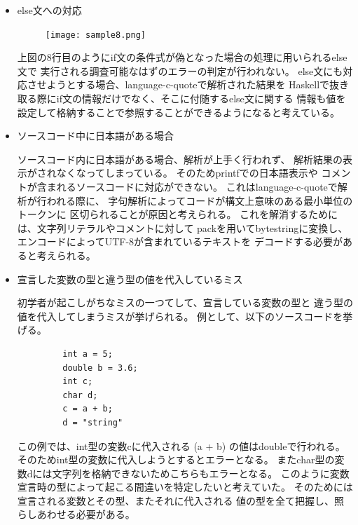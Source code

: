 \documentclass{csspaper}
\begin{document}
\begin{itemize}
         \item else文への対応
         
         \begin{figure}[h]
            \centering
            \texttt{[image: sample8.png]}
         \end{figure}

         上図の8行目のようにif文の条件式が偽となった場合の処理に用いられるelse文で
         実行される調査可能なはずのエラーの判定が行われない。
         else文にも対応させようとする場合、language-c-quoteで解析された結果を
         Haskellで抜き取る際にif文の情報だけでなく、そこに付随するelse文に関する
         情報も値を設定して格納することで参照することができるようになると考えている。

         \item ソースコード中に日本語がある場合
         
         ソースコード内に日本語がある場合、解析が上手く行われず、
         解析結果の表示がされなくなってしまっている。
         そのためprintfでの日本語表示や
         コメントが含まれるソースコードに対応ができない。
         これはlanguage-c-quoteで解析が行われる際に、
         字句解析によってコードが構文上意味のある最小単位のトークンに
         区切られることが原因と考えられる。
         これを解消するためには、文字列リテラルやコメントに対して
         packを用いてbytestringに変換し、
         エンコードによってUTF-8が含まれているテキストを
         デコードする必要があると考えられる。

         \item 宣言した変数の型と違う型の値を代入しているミス
         
         初学者が起こしがちなミスの一つてして、宣言している変数の型と
         違う型の値を代入してしまうミスが挙げられる。
         例として、以下のソースコードを挙げる。

         \begin{lstlisting}
         int a = 5;
         double b = 3.6;
         int c;
         char d;
         c = a + b;
         d = "string"
         \end{lstlisting}

         この例では、int型の変数cに代入される (a + b) の値はdoubleで行われる。
         そのためint型の変数に代入しようとするとエラーとなる。
         またchar型の変数dには文字列を格納できないためこちらもエラーとなる。
         このように変数宣言時の型によって起こる間違いを特定したいと考えていた。
         そのためには宣言される変数とその型、またそれに代入される
         値の型を全て把握し、照らしあわせる必要がある。


\end{itemize}
\end{document}
